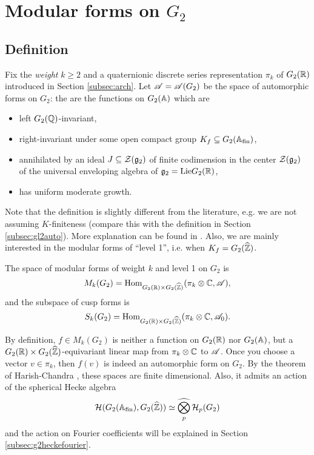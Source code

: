 \section{Modular forms on $G_2$}
\label{sec:g2mod}

\subsection{Definition}
\label{subsec:g2moddef}

Fix the \emph{weight} $k \ge 2$ and a quaternionic discrete series representation $\pi_k$ of $G_2(\mathbb{R})$ introduced in Section \ref{subsec:arch}.
Let $\mathscr{A} = \mathscr{A}(G_2)$ be the space of automorphic forms on $G_2$: the are the functions on $G_2(\mathbb{A})$ which are
\begin{itemize}
    \item left $G_2(\mathbb{Q})$-invariant,
    \item right-invariant under some open compact group $K_f \subseteq G_2(\mathbb{A}_{\mathrm{fin}})$,
    \item annihilated by an ideal $J \subseteq \mathcal{Z}(\mathfrak{g}_2)$ of finite codimension in the center $\mathcal{Z}(\mathfrak{g}_2)$ of the universal enveloping algebra of $\mathfrak{g}_2 = \mathrm{Lie} G_2(\mathbb{R})$,
    \item has uniform moderate growth.
\end{itemize}
Note that the definition is slightly different from the literature, e.g. we are not assuming $K$-finiteness (compare this with the definition in Section \ref{subsec:gl2auto}).
More explanation can be found in \cite[Section 7]{gan2002fourier}.
Also, we are mainly interested in the modular forms of ``level 1'', i.e. when $K_f = G_2(\widehat{\mathbb{Z}})$.

\begin{definition}
\label{def:g2mod}
The space of modular forms of weight $k$ and level 1 on $G_2$ is
$$
M_k(G_2) = \mathrm{Hom}_{G_2(\mathbb{R}) \times G_2(\widehat{\mathbb{Z}})} (\pi_k \otimes \mathbb{C}, \mathscr{A}),
$$
and the subspace of cusp forms is
$$
S_k(G_2) = \mathrm{Hom}_{G_2(\mathbb{R}) \times G_2(\widehat{\mathbb{Z}})} (\pi_k \otimes \mathbb{C}, \mathscr{A}_0).
$$
\end{definition}
By definition, $f \in M_k(G_2)$ is neither a function on $G_2(\mathbb{R})$ nor $G_2(\mathbb{A})$, but a $G_2(\mathbb{R}) \times G_2(\widehat{\mathbb{Z}})$-equivariant linear map from $\pi_k \otimes \mathbb{C}$ to $\mathscr{A}$.
Once you choose a vector $v \in \pi_k$, then $f(v)$ is indeed an automorphic form on $G_2$.
By the theorem of Harish-Chandra \cite[Theorem 1.7]{borel1979automorphic}, these spaces are finite dimensional.
Also, it admits an action of the spherical Hecke algebra
$$
\mathcal{H}(G_2(\mathbb{A}_{\mathrm{fin}}), G_2(\widehat{\mathbb{Z}})) \simeq \widehat{\bigotimes_p} \,\mathcal{H}_p(G_2)
$$
and the action on Fourier coefficients will be explained in Section \ref{subsec:g2heckefourier}.

